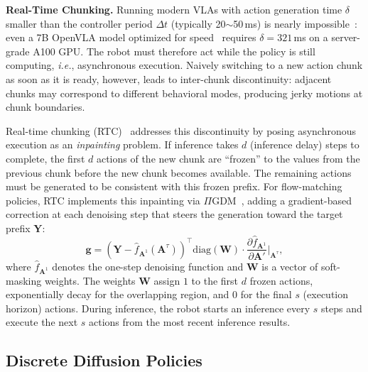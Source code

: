 \documentclass{article}
\newcommand{\ie}{\textit{i.e.}}
\begin{document}
\textbf{Real-Time Chunking.}
Running modern VLAs with action generation time $\delta$ smaller than the controller period $\Delta t$ (typically 20$\sim$50\,ms) is nearly impossible~\citep{black2025real}: even a 7B OpenVLA model optimized for speed~\citep{kim2025fine, kim2024openvla} requires $\delta = 321$\,ms on a server-grade A100 GPU.
The robot must therefore act while the policy is still computing, \ie, asynchronous execution.
Naively switching to a new action chunk as soon as it is ready, however, leads to inter-chunk discontinuity: adjacent chunks may correspond to different behavioral modes, producing jerky motions at chunk boundaries.

Real-time chunking (RTC)~\citep{black2025real} addresses this discontinuity by posing asynchronous execution as an \emph{inpainting} problem.
If inference takes $d$ (inference delay) steps to complete, the first $d$ actions of the new chunk are ``frozen'' to the values from the previous chunk before the new chunk becomes available.
The remaining actions must be generated to be consistent with this frozen prefix.
For flow-matching policies, RTC implements this inpainting via $\Pi$GDM~\citep{song2023pseudoinverse}, adding a gradient-based correction at each denoising step that steers the generation toward the target prefix $\mathbf{Y}$:
\begin{equation}
    \mathbf{g} = \left(\mathbf{Y} - \hat{f}_{\mathbf{A}^1}(\mathbf{A}^\tau)\right)^\top \text{diag}(\mathbf{W}) \cdot \frac{\partial \hat{f}_{\mathbf{A}^1}}{\partial \mathbf{A}'}\bigg|_{\mathbf{A}^\tau},
    \label{eq:guidance}
\end{equation}
where $\hat{f}_{\mathbf{A}^1}$ denotes the one-step denoising function and $\mathbf{W}$ is a vector of soft-masking weights.
The weights $\mathbf{W}$ assign $1$ to the first $d$ frozen actions, exponentially decay for the overlapping region, and $0$ for the final $s$ (execution horizon) actions.
During inference, the robot starts an inference every $s$ steps and execute the next $s$ actions from the most recent inference results.


\subsection{Discrete Diffusion Policies}
\label{sec:bg_discrete}
\end{document}
